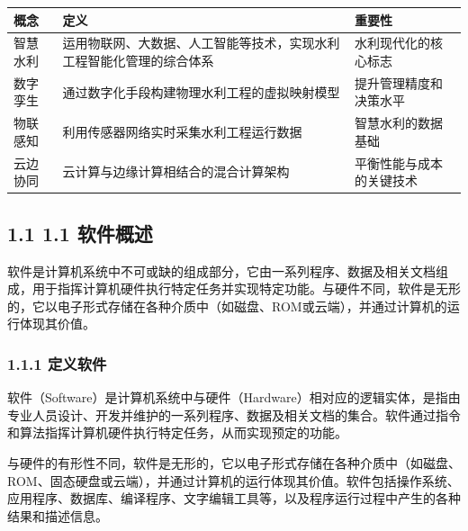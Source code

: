 \documentclass[12pt,a4paper]{article}
\begin{document}
\begin{longtable}[]{@{}
  >{\raggedright\arraybackslash}p{}
  >{\raggedright\arraybackslash}p{}
  >{\raggedright\arraybackslash}p{}@{}}
\toprule\noalign{}
\begin{minipage}[b]{\linewidth}\raggedright
概念
\end{minipage} & \begin{minipage}[b]{\linewidth}\raggedright
定义
\end{minipage} & \begin{minipage}[b]{\linewidth}\raggedright
重要性
\end{minipage} \\
\midrule\noalign{}
\endhead
\bottomrule\noalign{}
\endlastfoot
智慧水利 &
运用物联网、大数据、人工智能等技术，实现水利工程智能化管理的综合体系 &
水利现代化的核心标志 \\
数字孪生 & 通过数字化手段构建物理水利工程的虚拟映射模型 &
提升管理精度和决策水平 \\
物联感知 & 利用传感器网络实时采集水利工程运行数据 &
智慧水利的数据基础 \\
云边协同 & 云计算与边缘计算相结合的混合计算架构 &
平衡性能与成本的关键技术 \\
\end{longtable}

\subsection{1.1 1.1 软件概述}\label{ux8f6fux4ef6ux6982ux8ff0}

软件是计算机系统中不可或缺的组成部分，它由一系列程序、数据及相关文档组成，用于指挥计算机硬件执行特定任务并实现特定功能。与硬件不同，软件是无形的，它以电子形式存储在各种介质中（如磁盘、ROM或云端），并通过计算机的运行体现其价值。

\subsubsection{1.1.1 定义软件}\label{ux5b9aux4e49ux8f6fux4ef6}

软件（Software）是计算机系统中与硬件（Hardware）相对应的逻辑实体，是指由专业人员设计、开发并维护的一系列程序、数据及相关文档的集合。软件通过指令和算法指挥计算机硬件执行特定任务，从而实现预定的功能。

与硬件的有形性不同，软件是无形的，它以电子形式存储在各种介质中（如磁盘、ROM、固态硬盘或云端），并通过计算机的运行体现其价值。软件包括操作系统、应用程序、数据库、编译程序、文字编辑工具等，以及程序运行过程中产生的各种结果和描述信息。
\end{document}
